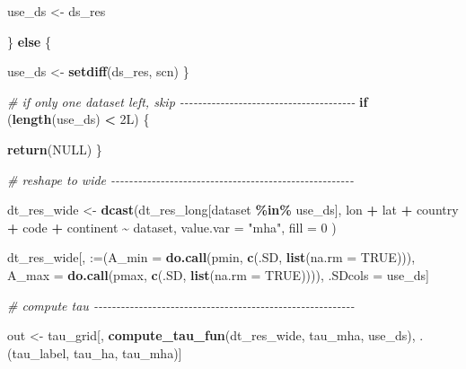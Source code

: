 \documentclass[
  11pt,
]{article}
\newenvironment{Shaded}{\begin{snugshade}}{\end{snugshade}}
\newcommand{\AttributeTok}[1]{\textcolor[rgb]{0.13,0.29,0.53}{#1}}
\newcommand{\CommentTok}[1]{\textcolor[rgb]{0.56,0.35,0.01}{\textit{#1}}}
\newcommand{\ConstantTok}[1]{\textcolor[rgb]{0.56,0.35,0.01}{#1}}
\newcommand{\ControlFlowTok}[1]{\textcolor[rgb]{0.13,0.29,0.53}{\textbf{#1}}}
\newcommand{\DataTypeTok}[1]{\textcolor[rgb]{0.13,0.29,0.53}{#1}}
\newcommand{\DecValTok}[1]{\textcolor[rgb]{0.00,0.00,0.81}{#1}}
\newcommand{\FunctionTok}[1]{\textcolor[rgb]{0.13,0.29,0.53}{\textbf{#1}}}
\newcommand{\NormalTok}[1]{#1}
\newcommand{\OtherTok}[1]{\textcolor[rgb]{0.56,0.35,0.01}{#1}}
\newcommand{\SpecialCharTok}[1]{\textcolor[rgb]{0.81,0.36,0.00}{\textbf{#1}}}
\newcommand{\StringTok}[1]{\textcolor[rgb]{0.31,0.60,0.02}{#1}}
\begin{document}
\begin{Shaded}
\begin{Highlighting}[]
\NormalTok{          use\_ds }\OtherTok{\textless{}{-}}\NormalTok{ ds\_res}

\NormalTok{        \} }\ControlFlowTok{else}\NormalTok{ \{}

\NormalTok{          use\_ds }\OtherTok{\textless{}{-}} \FunctionTok{setdiff}\NormalTok{(ds\_res, scn)}
\NormalTok{        \}}

        \CommentTok{\# if only one dataset left, skip {-}{-}{-}{-}{-}{-}{-}{-}{-}{-}{-}{-}{-}{-}{-}{-}{-}{-}{-}{-}{-}{-}{-}{-}{-}{-}{-}{-}{-}{-}{-}{-}{-}{-}{-}{-}{-}{-}{-}}
        \ControlFlowTok{if}\NormalTok{ (}\FunctionTok{length}\NormalTok{(use\_ds) }\SpecialCharTok{\textless{}} \DecValTok{2}\DataTypeTok{L}\NormalTok{) \{}

          \FunctionTok{return}\NormalTok{(}\ConstantTok{NULL}\NormalTok{)}
\NormalTok{        \}}

        \CommentTok{\# reshape to wide {-}{-}{-}{-}{-}{-}{-}{-}{-}{-}{-}{-}{-}{-}{-}{-}{-}{-}{-}{-}{-}{-}{-}{-}{-}{-}{-}{-}{-}{-}{-}{-}{-}{-}{-}{-}{-}{-}{-}{-}{-}{-}{-}{-}{-}{-}{-}{-}{-}{-}{-}{-}{-}{-}}

\NormalTok{        dt\_res\_wide }\OtherTok{\textless{}{-}} \FunctionTok{dcast}\NormalTok{(dt\_res\_long[dataset }\SpecialCharTok{\%in\%}\NormalTok{ use\_ds],}
\NormalTok{          lon }\SpecialCharTok{+}\NormalTok{ lat }\SpecialCharTok{+}\NormalTok{ country }\SpecialCharTok{+}\NormalTok{ code }\SpecialCharTok{+}\NormalTok{ continent }\SpecialCharTok{\textasciitilde{}}\NormalTok{ dataset,}
          \AttributeTok{value.var =} \StringTok{"mha"}\NormalTok{, }\AttributeTok{fill =} \DecValTok{0}
\NormalTok{        )}

\NormalTok{        dt\_res\_wide[, }\StringTok{\textasciigrave{}}\AttributeTok{:=}\StringTok{\textasciigrave{}}\NormalTok{(}\AttributeTok{A\_min =} \FunctionTok{do.call}\NormalTok{(pmin, }\FunctionTok{c}\NormalTok{(.SD, }\FunctionTok{list}\NormalTok{(}\AttributeTok{na.rm =} \ConstantTok{TRUE}\NormalTok{))),}
                  \AttributeTok{A\_max =} \FunctionTok{do.call}\NormalTok{(pmax, }\FunctionTok{c}\NormalTok{(.SD, }\FunctionTok{list}\NormalTok{(}\AttributeTok{na.rm =} \ConstantTok{TRUE}\NormalTok{)))),}
\NormalTok{           .SDcols }\OtherTok{=}\NormalTok{ use\_ds]}

        \CommentTok{\# compute tau {-}{-}{-}{-}{-}{-}{-}{-}{-}{-}{-}{-}{-}{-}{-}{-}{-}{-}{-}{-}{-}{-}{-}{-}{-}{-}{-}{-}{-}{-}{-}{-}{-}{-}{-}{-}{-}{-}{-}{-}{-}{-}{-}{-}{-}{-}{-}{-}{-}{-}{-}{-}{-}{-}{-}{-}{-}{-}}

\NormalTok{        out }\OtherTok{\textless{}{-}}\NormalTok{ tau\_grid[, }\FunctionTok{compute\_tau\_fun}\NormalTok{(dt\_res\_wide, tau\_mha, use\_ds),}
\NormalTok{                        .(tau\_label, tau\_ha, tau\_mha)]}


\end{Highlighting}
\end{Shaded}
\end{document}
